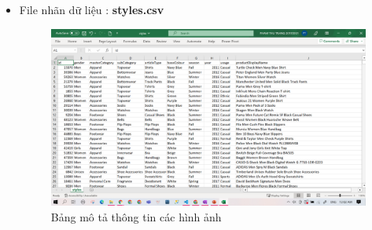 \begin{itemize}
\begin{itemize}
        \item File nhãn dữ liệu : \textbf{styles.csv}
        \begin{center}
            \begin{figure}[!h]
                \centering
                \includegraphics[scale = 0.25]{fileanh/1.png}
                \caption{Bảng mô tả thông tin các hình ảnh}
            \end{figure}
        \end{center}


\end{itemize}
\end{itemize}
